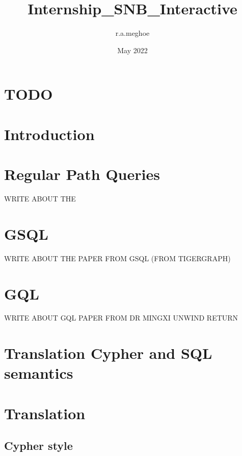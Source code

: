 \documentclass{article}
\title{Internship_SNB_Interactive}
\author{r.a.meghoe }
\date{May 2022}
\begin{document}
\section{TODO}

\section{Introduction}
\section{Regular Path Queries}
WRITE ABOUT THE 
\section{GSQL}
WRITE ABOUT THE PAPER FROM GSQL (FROM TIGERGRAPH)
\section{GQL}

WRITE ABOUT GQL PAPER FROM DR MINGXI
UNWIND
RETURN
\section{Translation Cypher and SQL semantics}
\section{Translation} 
\subsection{Cypher style}
\end{document}
